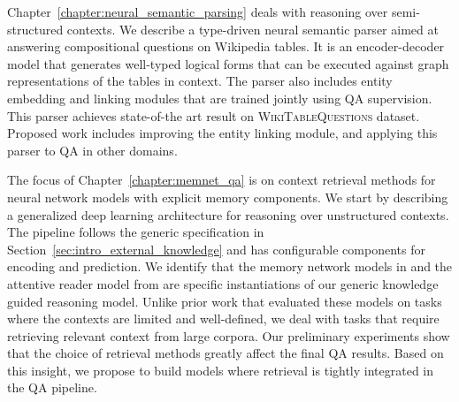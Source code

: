 Chapter~\ref{chapter:neural_semantic_parsing} deals with reasoning over semi-structured contexts. We describe a type-driven
neural semantic parser aimed at answering compositional questions on Wikipedia tables. It is an encoder-decoder model that generates
well-typed logical forms that can be executed against graph representations of the tables in context. The parser also includes entity embedding
and linking modules that are trained jointly using QA supervision. This parser achieves state-of-the art result on \textsc{WikiTableQuestions} dataset.
Proposed work includes improving the entity linking module, and applying this parser to QA in other domains.

The focus of Chapter~\ref{chapter:memnet_qa} is on context retrieval methods for neural network models with explicit memory components.
We start by describing a generalized deep learning architecture for reasoning over unstructured contexts. The pipeline follows the generic
specification in Section~\ref{sec:intro_external_knowledge} and has configurable components
for encoding and prediction. We identify that the memory network models in \cite{weston2014memory,Sukhbaatar2015EndToEndMN,Xiong2016DynamicMN}
and the attentive reader model from \cite{hermann2015teaching} are specific instantiations of our generic knowledge guided reasoning model.
Unlike prior work that evaluated these models on tasks where the contexts are limited and well-defined, we deal with tasks that require
retrieving relevant context from large corpora. Our preliminary experiments show that the choice of retrieval methods greatly affect the
final QA results. Based on this insight, we propose to build models where retrieval is tightly integrated in the QA pipeline.

